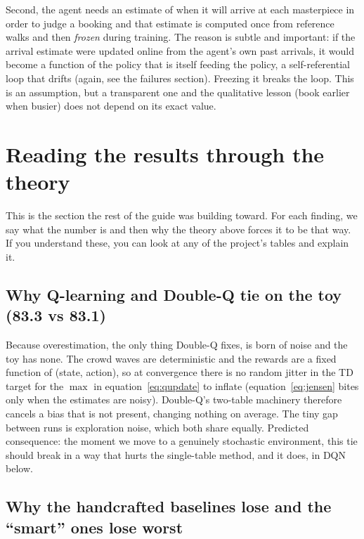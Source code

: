 \documentclass[11pt]{article}
\newcommand{\key}[1]{\textit{#1}}            %
\newcommand{\why}[1]{\textcolor{inkblue}{#1}}
\begin{document}
Second, the agent needs an estimate of when it will arrive at each masterpiece in order to
judge a booking and that estimate is computed once from reference walks and then
\key{frozen} during training. The reason is subtle and important: if the arrival estimate
were updated online from the agent's own past arrivals, it would become a function of the
policy that is itself feeding the policy, a self-referential loop that drifts (again, see
the failures section). Freezing it breaks the loop. This is an assumption, but a transparent
one and the qualitative lesson (book earlier when busier) does not depend on its exact
value.

\section{Reading the results through the theory}

This is the section the rest of the guide was building toward. For each finding, we say
what the number is and then \why{why the theory above forces it to be that way.} If you
understand these, you can look at any of the project's tables and explain it.

\subsection{Why Q-learning and Double-Q tie on the toy (83.3 vs 83.1)}

\why{Because overestimation, the only thing Double-Q fixes, is born of noise and the toy
has none.} The crowd waves are deterministic and the rewards are a fixed function of
(state, action), so at convergence there is no random jitter in the TD target for the
$\max$ in equation~\eqref{eq:qupdate} to inflate (equation~\eqref{eq:jensen} bites only when
the estimates are noisy). Double-Q's two-table machinery therefore cancels a bias that is
not present, changing nothing on average. The tiny gap between runs is exploration noise,
which both share equally. Predicted consequence: the moment we move to a genuinely
stochastic environment, this tie should break in a way that hurts the single-table method,
and it does, in DQN below.

\subsection{Why the handcrafted baselines lose and the ``smart'' ones lose worst}
\end{document}
